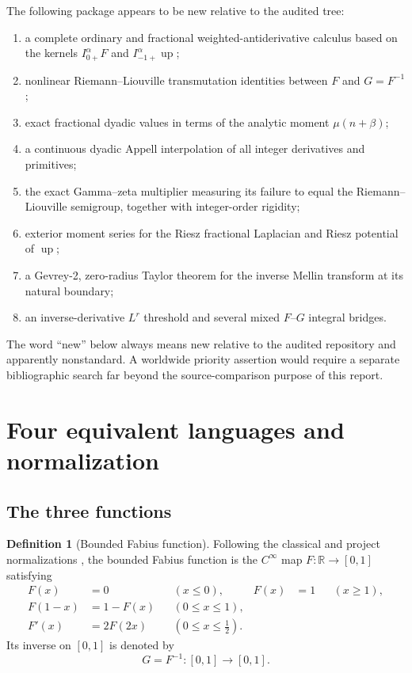 \documentclass[11pt]{article}
\theoremstyle{definition}
\newtheorem{definition}[theorem]{Definition}
\theoremstyle{remark}
\newcommand{\R}{\mathbb R}
\newcommand{\Up}{\operatorname{up}}
\begin{document}
The following package appears to be new relative to the audited tree:
\begin{enumerate}
\item a complete ordinary and fractional weighted-antiderivative calculus based on the kernels
      $I_{0+}^{\alpha}F$ and $I_{-1+}^{\alpha}\Up$;
\item nonlinear Riemann--Liouville transmutation identities between $F$ and $G=F^{-1}$;
\item exact fractional dyadic values in terms of the analytic moment $\mu(n+\beta)$;
\item a continuous dyadic Appell interpolation of all integer derivatives and primitives;
\item the exact Gamma--zeta multiplier measuring its failure to equal the
      Riemann--Liouville semigroup, together with integer-order rigidity;
\item exterior moment series for the Riesz fractional Laplacian and Riesz potential of $\Up$;
\item a Gevrey-2, zero-radius Taylor theorem for the inverse Mellin transform at its natural
      boundary;
\item an inverse-derivative $L^r$ threshold and several mixed $F$--$G$ integral bridges.
\end{enumerate}

The word ``new'' below always means new relative to the audited repository and apparently
nonstandard.  A worldwide priority assertion would require a separate bibliographic search
far beyond the source-comparison purpose of this report.

\section{Four equivalent languages and normalization}
\label{sec:notation}

\subsection{The three functions}

\begin{definition}[Bounded Fabius function]
Following the classical and project normalizations \cite{fabius1966,rvachev1990,project-primary},
the bounded Fabius function is the $C^\infty$ map $F:\R\to[0,1]$ satisfying
\begin{align}
 F(x)&=0 &&(x\le0),& F(x)&=1 &&(x\ge1),\label{eq:F-total}\\
 F(1-x)&=1-F(x) &&(0\le x\le1),\label{eq:F-sym}\\
 F'(x)&=2F(2x) &&(0\le x\le\tfrac12).\label{eq:F-dilation}
\end{align}
Its inverse on $[0,1]$ is denoted by
\[
 G=F^{-1}:[0,1]\longrightarrow[0,1].
\]
\end{definition}
\end{document}
